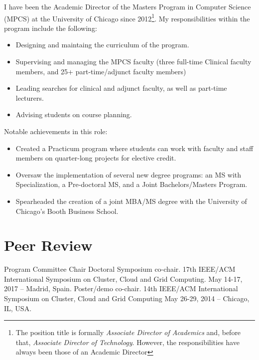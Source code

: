 \documentclass{resume}
\begin{document}
I have been the Academic Director of the Masters Program in Computer Science (MPCS) at the University of Chicago since 2012\footnote{The position title is formally \emph{Associate Director of Academics} and, before that, \emph{Associate Director of Technology}. However, the responsibilities have always been those of an Academic Director}. My responsibilities within the program include the following:

\begin{itemize}
 \item Designing and maintaing the curriculum of the program.
 \item Supervising and managing the MPCS faculty (three full-time Clinical faculty members, and 25+ part-time/adjunct faculty members)
 \item Leading searches for clinical and adjunct faculty, as well as part-time lecturers.
 \item Advising students on course planning.
\end{itemize}

\noindent Notable achievements in this role:

\begin{itemize}
 \item Created a Practicum program where students can work with faculty and staff members on quarter-long projects for elective credit.
 \item Oversaw the implementation of several new degree programs: an MS with Specialization, a Pre-doctoral MS, and a Joint Bachelors/Masters Program.
 \item Spearheaded the creation of a joint MBA/MS degree with the University of Chicago's Booth Business School.
\end{itemize}

\section*{\hspace{-1cm}Peer Review}

\begin{category}{Program Committee Chair}
\citembullet Doctoral Symposium co-chair. 17th IEEE/ACM International Symposium on Cluster, Cloud and Grid Computing. May 14-17, 2017 -- Madrid, Spain.
\citembullet Poster/demo co-chair. 14th IEEE/ACM International Symposium on Cluster, Cloud and Grid Computing
May 26-29, 2014 -- Chicago, IL, USA.
\end{category}

\vspace{1em}
\end{document}
